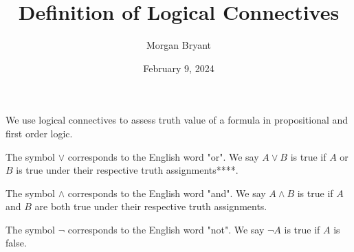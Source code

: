 \documentclass[a4paper]{article}
\title{Definition of Logical Connectives}
\date{February 9, 2024}
\author{Morgan Bryant}
\begin{document}
\maketitle
\par{We use logical connectives to assess truth value of a formula in propositional and first order logic.}\par{The symbol \(\lor\) corresponds to the English word "or". We say \(A  \lor  B\) is true if \(A\) or \(B\) is true under their respective truth assignments****.}\par{The symbol \(\land\) corresponds to the English word "and". We say \(A \land  B\) is true if \(A\) and \(B\) are both true under their respective truth assignments.}\par{The symbol \(\neg\) corresponds to the English word "not". We say \(\neg  A\) is true if \(A\) is false.}
\printbibliography
\end{document}
